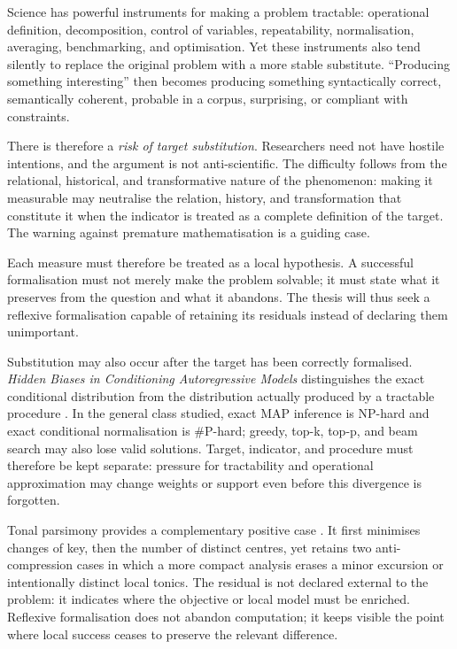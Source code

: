 \documentclass[11pt,a4paper]{article}
\begin{document}
Science has powerful instruments for making a problem tractable: operational
definition, decomposition, control of variables, repeatability, normalisation,
averaging, benchmarking, and optimisation. Yet these instruments also tend
silently to replace the original problem with a more stable substitute.
``Producing something interesting'' then becomes producing something
syntactically correct, semantically coherent, probable in a corpus, surprising,
or compliant with constraints.

There is therefore a \emph{risk of target substitution}. Researchers need not
have hostile intentions, and the argument is not anti-scientific. The difficulty
follows from the relational, historical, and
transformative nature of the phenomenon: making it measurable may neutralise
the relation, history, and transformation that constitute it when the indicator
is treated as a complete definition of the target. The warning against premature
mathematisation
\parencite{russell1995rationality,russell1995awardlecture} is a guiding case.

Each measure must therefore be treated as a local hypothesis. A successful
formalisation must not merely make the problem solvable; it must state what it
preserves from the question and what it abandons. The thesis will thus seek a
reflexive formalisation capable of retaining its residuals instead of declaring
them unimportant.

Substitution may also occur after the target has been correctly formalised.
\emph{Hidden Biases in Conditioning Autoregressive Models} distinguishes the
exact conditional distribution from the distribution actually produced by a
tractable procedure \parencite{pachet2026biases}. In the general class studied,
exact MAP inference is NP-hard and exact conditional normalisation is
\#P-hard; greedy, top-k, top-p, and beam search may also lose valid solutions.
Target, indicator, and procedure must therefore be kept separate: pressure for
tractability and operational approximation may change weights or support even
before this divergence is forgotten.

Tonal parsimony provides a complementary positive case
\parencite{pachet2026tonalparsimony}. It first minimises changes of key, then the
number of distinct centres, yet retains two anti-compression cases in which a
more compact analysis erases a minor excursion or intentionally distinct local
tonics. The residual is not declared external to the problem: it indicates
where the objective or local model must be enriched. Reflexive formalisation
does not abandon computation; it keeps visible the point where local success
ceases to preserve the relevant difference.
\end{document}
